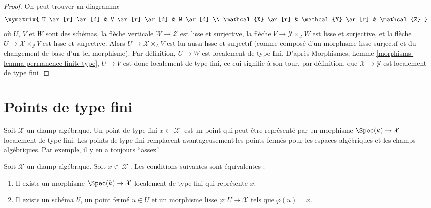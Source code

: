 \begin{proof}
On peut trouver un diagramme
$$
\xymatrix{
U \ar[r] \ar[d] & V \ar[r] \ar[d] & W \ar[d] \\
\mathcal{X} \ar[r] & \mathcal{Y} \ar[r] & \mathcal{Z}
}
$$
où $U$, $V$ et $W$ sont des schémas, la flèche verticale
$W \to \mathcal{Z}$ est lisse et surjective, la flèche
$V \to \mathcal{Y} \times_\mathcal{Z} W$ est lisse et surjective,
et la flèche $U \to \mathcal{X} \times_\mathcal{Y} V$ est lisse et
surjective. Alors $U \to \mathcal{X} \times_\mathcal{Z} V$ est lui aussi
lisse et surjectif (comme composé d'un morphisme lisse surjectif et du
changement de base d'un tel morphisme). Par définition, $U \to W$ est
localement de type fini. D'après Morphismes, Lemme
\ref{morphisms-lemma-permanence-finite-type}, $U \to V$ est donc
localement de type fini, ce qui signifie à son tour, par définition,
que $\mathcal{X} \to \mathcal{Y}$ est localement de type fini.
\end{proof}










\section{Points de type fini}
\label{section-points-finite-type}

\noindent
Soit $\mathcal{X}$ un champ algébrique.
Un point de type fini $x \in |\mathcal{X}|$ est un point qui peut être représenté
par un morphisme $\Spec(k) \to \mathcal{X}$ localement de type fini.
Les points de type fini remplacent avantageusement les points fermés pour les
espaces algébriques et les champs algébriques. Par exemple, il y en a toujours
``assez''.

\begin{lemma}
\label{lemma-point-finite-type}
Soit $\mathcal{X}$ un champ algébrique.
Soit $x \in |\mathcal{X}|$. Les conditions suivantes sont équivalentes :
\begin{enumerate}
\item Il existe un morphisme $\Spec(k) \to \mathcal{X}$
localement de type fini qui représente $x$.
\item Il existe un schéma $U$, un point fermé $u \in U$ et un morphisme
lisse $\varphi : U \to \mathcal{X}$ tels que $\varphi(u) = x$.
\end{enumerate}
\end{lemma}

